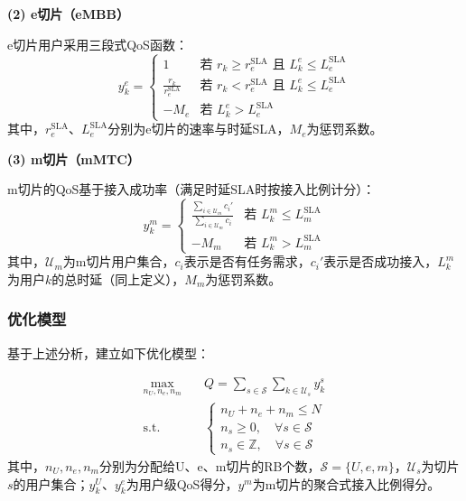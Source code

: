\textbf{(2) e切片（eMBB）}

e切片用户采用三段式QoS函数：
\begin{equation}
y_k^{e} = \begin{cases}
1 & \text{若 } r_k \geq r_{e}^{\text{SLA}} \text{ 且 } L_k^{e} \leq L_{e}^{\text{SLA}} \\
\frac{r_k}{r_{e}^{\text{SLA}}} & \text{若 } r_k < r_{e}^{\text{SLA}} \text{ 且 } L_k^{e} \leq L_{e}^{\text{SLA}} \\
-M_{e} & \text{若 } L_k^{e} > L_{e}^{\text{SLA}}
\end{cases}
\end{equation}
其中，$r_e^{\text{SLA}}$、$L_e^{\text{SLA}}$分别为e切片的速率与时延SLA，$M_e$为惩罚系数。

\textbf{(3) m切片（mMTC）}

m切片的QoS基于接入成功率（满足时延SLA时按接入比例计分）：
\begin{equation}
y_k^{m} = \begin{cases}
\frac{\sum_{i \in \mathcal{U}_{m}} c_i'}{\sum_{i \in \mathcal{U}_{m}} c_i} & \text{若 } L_k^{m} \le L_{m}^{\text{SLA}} \\
-M_{m} & \text{若 } L_k^{m} > L_{m}^{\text{SLA}}
\end{cases}
\end{equation}
其中，$\mathcal{U}_m$为m切片用户集合，$c_i$表示是否有任务需求，$c_i'$表示是否成功接入，$L_k^{m}$为用户$k$的总时延（同上定义），$M_m$为惩罚系数。

\subsubsection{优化模型}

基于上述分析，建立如下优化模型：

\begin{equation}
\begin{aligned}
\max_{n_U, n_e, n_m} \quad & Q = \sum_{s \in \mathcal{S}} \sum_{k \in \mathcal{U}_s} y_k^s \\
\text{s.t.} \quad & \begin{cases}
 n_U + n_e + n_m \leq N \\
 n_s \geq 0, \quad \forall s \in \mathcal{S} \\
 n_s \in \mathbb{Z}, \quad \forall s \in \mathcal{S}
 \end{cases}
 \end{aligned}
 \end{equation}
其中，$n_U, n_e, n_m$分别为分配给U、e、m切片的RB个数，$\mathcal{S}=\{U,e,m\}$，$\mathcal{U}_s$为切片$s$的用户集合；$y_k^{U}$、$y_k^{e}$为用户级QoS得分，$y^{m}$为m切片的聚合式接入比例得分。

